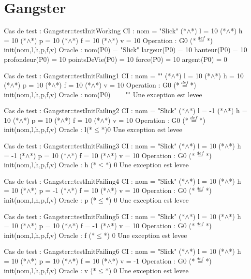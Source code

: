 \documentclass[a4paper, 11pt, notitlepage]{report}
\begin{document}
\section{Gangster}
\begin{Test}

Cas de test  : Gangster::testInitWorking
CI : nom = "Slick" (*$\land$*) l = 10 (*$\land$*) h = 10 (*$\land$*) p = 10 (*$\land$*) f = 10 (*$\land$*) v = 10
Operation : G0 (*$\stackrel{def}{=}$*) init(nom,l,h,p,f,v)
Oracle :
	nom(P0) = "Slick"
	largeur(P0) = 10
	hauteur(P0) = 10
	profondeur(P0) = 10
	pointsDeVie(P0) = 10
	force(P0) = 10
	argent(P0) = 0

Cas de test  : Gangster::testInitFailing1
CI : nom = "" (*$\land$*) l = 10 (*$\land$*) h = 10 (*$\land$*) p = 10 (*$\land$*) f = 10 (*$\land$*) v = 10
Operation : G0 (*$\stackrel{def}{=}$*) init(nom,l,h,p,f,v)
Oracle :
	nom(P0) == ""
	Une exception est levee
	
Cas de test  : Gangster::testInitFailing2
CI : nom = "Slick" (*$\land$*) l = -1 (*$\land$*) h = 10 (*$\land$*) p = 10 (*$\land$*) f = 10 (*$\land$*) v = 10
Operation : G0 (*$\stackrel{def}{=}$*) init(nom,l,h,p,f,v)
Oracle :
	l(*$\le$*)0
	Une exception est levee

Cas de test  : Gangster::testInitFailing3
CI : nom = "Slick" (*$\land$*) l = 10 (*$\land$*) h = -1 (*$\land$*) p = 10 (*$\land$*) f = 10 (*$\land$*) v = 10
Operation : G0 (*$\stackrel{def}{=}$*) init(nom,l,h,p,f,v)
Oracle :
	h (*$\le$*) 0
	Une exception est levee
	
Cas de test  : Gangster::testInitFailing4
CI : nom = "Slick" (*$\land$*) l = 10 (*$\land$*) h = 10 (*$\land$*) p = -1 (*$\land$*) f = 10 (*$\land$*) v = 10
Operation : G0 (*$\stackrel{def}{=}$*) init(nom,l,h,p,f,v)
Oracle :
	p (*$\le$*) 0
	Une exception est levee

Cas de test  : Gangster::testInitFailing5
CI : nom = "Slick" (*$\land$*) l = 10 (*$\land$*) h = 10 (*$\land$*) p = 10 (*$\land$*) f = -1 (*$\land$*) v = 10
Operation : G0 (*$\stackrel{def}{=}$*) init(nom,l,h,p,f,v)
Oracle :
	f (*$\le$*) 0
	Une exception est levee

Cas de test  : Gangster::testInitFailing6
CI : nom =  "Slick" (*$\land$*) l = 10 (*$\land$*) h = 10 (*$\land$*) p = 10 (*$\land$*) f = 10 (*$\land$*) v = -1
Operation : G0 (*$\stackrel{def}{=}$*) init(nom,l,h,p,f,v)
Oracle :
	v (*$\le$*) 0
	Une exception est levee


     
\end{Test}
\end{document}

